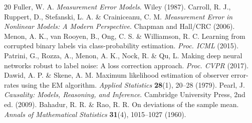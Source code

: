 \begingroup
\small
\begin{thebibliography}{20}
 Fuller, W. A. \textit{Measurement Error Models}. Wiley (1987).
 Carroll, R. J., Ruppert, D., Stefanski, L. A. \& Crainiceanu, C. M. \textit{Measurement Error in Nonlinear Models: A Modern Perspective}. Chapman and Hall/CRC (2006).
 Menon, A. K., van Rooyen, B., Ong, C. S. \& Williamson, R. C. Learning from corrupted binary labels via class-probability estimation. \textit{Proc. ICML} (2015).
 Patrini, G., Rozza, A., Menon, A. K., Nock, R. \& Qu, L. Making deep neural networks robust to label noise: A loss correction approach. \textit{Proc. CVPR} (2017).
 Dawid, A. P. \& Skene, A. M. Maximum likelihood estimation of observer error-rates using the EM algorithm. \textit{Applied Statistics} \textbf{28}(1), 20--28 (1979).
 Pearl, J. \textit{Causality: Models, Reasoning, and Inference}. Cambridge University Press, 2nd ed. (2009).
 Bahadur, R. R. \& Rao, R. R. On deviations of the sample mean. \textit{Annals of Mathematical Statistics} \textbf{31}(4), 1015--1027 (1960).
\end{thebibliography}
\endgroup


\endinput
